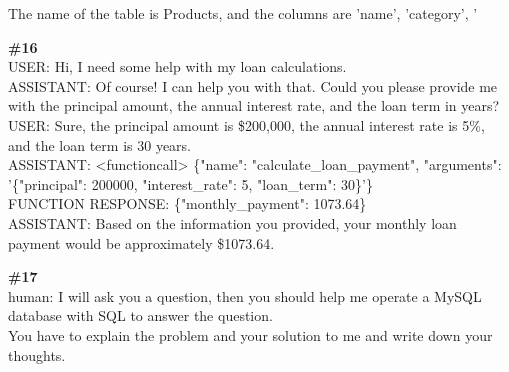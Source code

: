 \documentclass[10pt]{article}
\begin{document}
\begin{Form}
\begin{tcolorbox}[colback=convbg,colframe=itemframe,boxrule=0.8pt,arc=2pt,breakable,left=6pt,right=6pt,top=5pt,bottom=5pt]
{The name of the table is Products, and the columns are 'name', 'category', '}
\end{tcolorbox}
\vspace{-1pt}
\CheckBox[name=q15c,width=1.6ex,height=1.6ex,bordercolor={0.45 0.45 0.45}]{~\textcolor{cbox}{COMPACT}}\quad
\CheckBox[name=q15d,width=1.6ex,height=1.6ex,bordercolor={0.45 0.45 0.45}]{~\textcolor{dbox}{DIFFUSE}}\quad
\CheckBox[name=q15n,width=1.6ex,height=1.6ex,bordercolor={0.45 0.45 0.45}]{~\textcolor{nbox}{NONE}}
\vspace{8pt}
\begin{tcolorbox}[colback=convbg,colframe=itemframe,boxrule=0.8pt,arc=2pt,breakable,left=6pt,right=6pt,top=5pt,bottom=5pt]
{\footnotesize\textbf{\#16}}\\[3pt]
{\footnotesize USER: Hi, I need some help with my loan calculations. \\[2pt]
ASSISTANT: Of course! I can help you with that. Could you please provide me with the principal amount, the annual interest rate, and the loan term in years?   \\[2pt]
USER: Sure, the principal amount is \$200,000, the annual interest rate is 5\%, and the loan term is 30 years. \\[2pt]
ASSISTANT: <functioncall> \{"name": "calculate\_loan\_payment", "arguments": '\{"principal": 200000, "interest\_rate": 5, "loan\_term": 30\}'\}   \\[2pt]
FUNCTION RESPONSE: \{"monthly\_payment": 1073.64\} \\[2pt]
ASSISTANT: Based on the information you provided, your monthly loan payment would be approximately \$1073.64.  }
\end{tcolorbox}
\vspace{-1pt}
\CheckBox[name=q16c,width=1.6ex,height=1.6ex,bordercolor={0.45 0.45 0.45}]{~\textcolor{cbox}{COMPACT}}\quad
\CheckBox[name=q16d,width=1.6ex,height=1.6ex,bordercolor={0.45 0.45 0.45}]{~\textcolor{dbox}{DIFFUSE}}\quad
\CheckBox[name=q16n,width=1.6ex,height=1.6ex,bordercolor={0.45 0.45 0.45}]{~\textcolor{nbox}{NONE}}
\vspace{8pt}
\begin{tcolorbox}[colback=convbg,colframe=itemframe,boxrule=0.8pt,arc=2pt,breakable,left=6pt,right=6pt,top=5pt,bottom=5pt]
{\footnotesize\textbf{\#17}}\\[3pt]
{\footnotesize human: I will ask you a question, then you should help me operate a MySQL database with SQL to answer the question. \\[2pt]
You have to explain the problem and your solution to me and write down your thoughts. \\[2pt]
}
\end{tcolorbox}
\end{Form}
\end{document}
